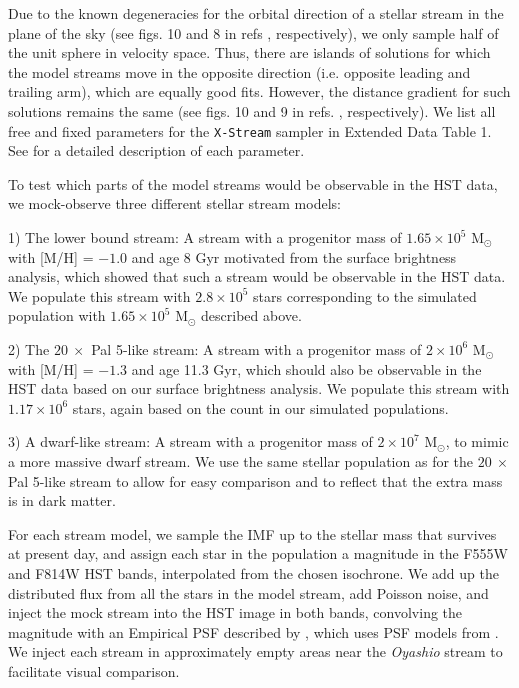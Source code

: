 \documentclass[pdflatex,sn-mathphys-num]{sn-jnl}
\theoremstyle{thmstyleone}
\theoremstyle{thmstyletwo}
\theoremstyle{thmstylethree}
\begin{document}
Due to the known degeneracies for the orbital direction of a stellar stream in the plane of the sky (see figs. 10 and 8 in refs \citep[][]{pearson2022b, NibPear2025}, respectively), we only sample half of the unit sphere in velocity space.
Thus, there are islands of solutions for which the model streams move in the opposite direction (i.e. opposite leading and trailing arm), which are equally good fits. However, the distance gradient for such solutions remains the same (see figs. 10 and 9 in refs. \citep[][]{pearson2022b, NibPear2025}, respectively).
We list all free and fixed parameters for the \texttt{X-Stream} sampler in Extended Data Table 1. See \citep{NibPear2025} for a detailed description of each parameter.


To test which parts of the model streams would be observable in the HST data, we mock-observe three different stellar stream models:

1) The lower bound stream: A stream with a progenitor mass of $1.65 \times 10^5$ M$_{\odot}$ with [M/H] = $-1.0$ and age 8 Gyr motivated from the surface brightness analysis, which showed that such a stream would be observable in the HST data. We populate this stream with $2.8\times 10^{5}$ stars corresponding to the simulated population
with $1.65 \times 10^5$ M$_{\odot}$ described above.

2) The $20~ \times$ Pal 5-like stream: A stream with a progenitor mass of $2 \times 10^6$ M$_{\odot}$ with [M/H] = $-1.3$ and age 11.3 Gyr, which should also be observable in the HST data based on our surface brightness analysis. We populate this stream with $1.17\times 10^{6}$ stars, again based on the count in our simulated populations.

3) A dwarf-like stream: A stream with a progenitor mass of $2 \times 10^7$ M$_{\odot}$, to mimic a more massive dwarf stream. We use the same stellar population as for the $20~ \times$ Pal 5-like stream to allow for easy comparison and to
reflect that the extra mass is in dark matter.

For each stream model, we sample the IMF up to the stellar mass that survives at present day, and assign
each star in the population a magnitude in the F555W and F814W HST bands, interpolated from the chosen isochrone.
We add up the distributed flux from all the stars in the model stream, add Poisson noise, and inject the mock stream into the HST image in both bands, convolving the magnitude with an Empirical PSF described by \citep{Revalski2024}, which uses PSF models from \citep{Anderson2016}. We inject each stream in approximately empty areas near the {\it Oyashio} stream to facilitate visual comparison.
\end{document}
